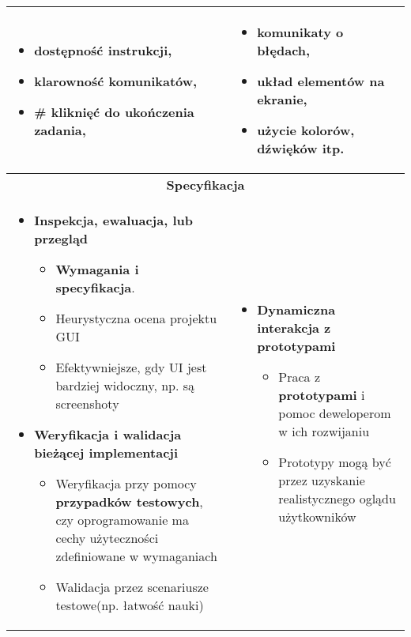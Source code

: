 \documentclass[../main.tex]{subfiles}
\begin{document}
\begin{table}[H]
\begin{center}
\begin{tabular}{| p{8cm} | p{8cm} |}
                \hline
                \begin{itemize}
                    \item dostępność instrukcji,
                    \item klarowność komunikatów,
                    \item \# kliknięć do ukończenia zadania,
                \end{itemize}
                &
                \begin{itemize}
                    \item komunikaty o błędach,
                    \item układ elementów na ekranie,
                    \item użycie kolorów, dźwięków itp.
                \end{itemize}\\
                \hline
                \hline
                \multicolumn{2}{|c|}{\textbf{Specyfikacja}}\\
                \hline
                \begin{itemize}
                    \item \textbf{Inspekcja, ewaluacja, lub przegląd}
                    \begin{itemize}
                        \item \textbf{Wymagania i specyfikacja}.
                        \item Heurystyczna ocena projektu GUI
                        \item Efektywniejsze, gdy UI jest bardziej widoczny, np. są screenshoty
                    \end{itemize}

                    \item \textbf{Weryfikacja i walidacja bieżącej implementacji}
                    \begin{itemize}
                        \item Weryfikacja przy pomocy \textbf{przypadków testowych}, czy oprogramowanie ma cechy użyteczności
                        zdefiniowane w wymaganiach
                        \item Walidacja przez scenariusze testowe(np. łatwość nauki)
                    \end{itemize}
                \end{itemize}
                &
                \begin{itemize}
                    \item \textbf{Dynamiczna interakcja z prototypami}
                    \begin{itemize}
                        \item Praca z \textbf{prototypami} i pomoc deweloperom w ich rozwijaniu
                        \item Prototypy mogą być przez uzyskanie realistycznego oglądu użytkowników
                    \end{itemize}


\end{itemize}
\end{tabular}
\end{center}
\end{table}
\end{document}
